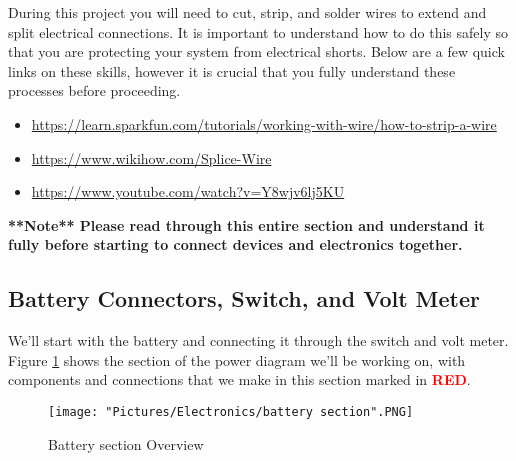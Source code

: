 \documentclass[12pt]{article}
\begin{document}
\noindent During this project you will need to cut, strip, and solder wires to extend and split electrical connections. It is important to understand how to do this safely so that you are protecting your system from electrical shorts. Below are a few quick links on these skills, however it is crucial that you fully understand these processes before proceeding. 

\begin{itemize}
	\item \href{https://learn.sparkfun.com/tutorials/working-with-wire/how-to-strip-a-wire}{https://learn.sparkfun.com/tutorials/working-with-wire/how-to-strip-a-wire}
	\item \href{https://www.wikihow.com/Splice-Wire}{https://www.wikihow.com/Splice-Wire}
	\item \href{https://www.youtube.com/watch?v=Y8wjv6lj5KU}{https://www.youtube.com/watch?v=Y8wjv6lj5KU}
\end{itemize}

\noindent \textbf{**Note** Please read through this entire section and understand it fully before starting to connect devices and electronics together. }

\subsection{Battery Connectors, Switch, and Volt Meter}

We'll start with the battery and connecting it through the switch and volt meter. Figure \ref{battery section} shows the section of the power diagram we'll be working on, with components and connections that we make in this section marked in \textcolor{red}{\textbf{RED}}.

\begin{figure}[H]
  	\centering
    	\texttt{[image: "Pictures/Electronics/battery section".PNG]}
 	\caption{Battery section Overview}
	\label{battery section}
\end{figure}
\end{document}
